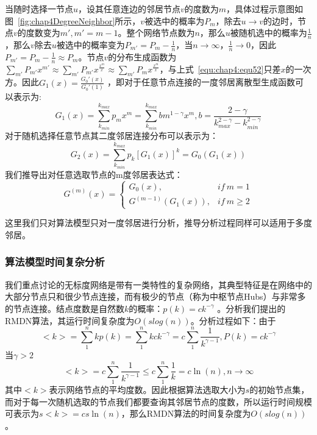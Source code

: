 当随时选择一节点$u$，设其任意连边的邻居节点$v$的度数为$m$，具体过程示意图如图~\ref{fig:chap4DegreeNeighbor}所示，$v$被选中的概率为$P_m$，除去$u\to v$的边时，节点$v$的度数变为$m',m'= m-1$。整个网络节点数为$n$，那么$u$被随机选中的概率为$\frac{1}{n}$，那么$v$除去$u$被选中的概率变为$P_{m'}=P_m-\frac{1}{n}$，当$n\to \infty $，$\frac{1}{n} \to 0$，因此$P_{m'}=P_m-\frac{1}{n} \approx P_m$。节点$v$的分布生成函数为$\sum_{m'}P_{m'}x^{m'} \approx \sum_{m'}P_{m'}x^{\frac{x^m}{x}} \approx \sum_{m'}P_{m}x^{\frac{x^m}{x}} $，与上式~\ref{equ:chap4:equ52}只差$x$的一次方。因此$G_1(x)=\frac{G_0'(x)}{G_0'(1)}$
，即对于任意节点连接的一度邻居离散型生成函数可以表示为:
\begin{equation}
\label{equ:chap4:equ8}
G_{1}(x) = \sum_{k_{min}}^{k_{max}}p_{m}x^{m} = \sum_{k_{min}}^{k_{max}}bm^{1-\gamma}x^{m}, b = \frac{2-\gamma}{k_{max}^{2-\gamma}-k_{min}^{2-\gamma}}
\end{equation}
对于随机选择任意节点其二度邻居连接分布可以表示为：
\begin{equation}
\label{equ:chap4:equ9}
G_{2}(x) = \sum_{k_{min}}^{k_{max}}p_{k}{[G_{1}(x)]}^{k} = G_{0}(G_{1}(x))
\end{equation}
我们推导出对任意选取节点的m度邻居表达式：
\begin{equation}
\label{equ:chap4:equ10}
G^{(m)}(x) = 
\begin{cases} 
G_{0}(x), & if ~ m = 1 \\
G^{(m-1)}(G_{1}(x)), & if ~ m \geq 2
\end{cases}
\end{equation}

这里我们只对算法模型只对一度邻居进行分析，推导分析过程同样可以适用于多度邻居。
\subsubsection{算法模型时间复杂分析}
我们重点讨论的无标度网络是带有一类特性的复杂网络，其典型特征是在网络中的大部分节点只和很少节点连接，而有极少的节点（称为中枢节点Hubs）与非常多的节点连接。结点度数是自然数$k$的概率：$p(k) = ck^{-\gamma}$ \cite{cohen2003efficient}。分析我们提出的RMDN算法，其运行时间复杂度为$O(slog(n))$。分析过程如下：由于
\begin{equation}
<k>=\sum_ {1}^{n}kp(k)=\sum_{1}^{n}kck^{-\gamma}=c\sum_{1}^{n}\frac{1}{k^{\gamma -1}},P(k)=ck^{-\gamma}
\end{equation}
当$\gamma >2$
\begin{equation}
<k>=c\sum_{1}^{n}\frac{1}{k^{\gamma -1}} \le c\sum\limits_{1}^{n}\frac{1}{k}=c\ln (n),n\to \infty
\end{equation}
其中$<k>$表示网络节点的平均度数。因此根据算法选取大小为$s$的初始节点集，而对于每一次随机选取的节点我们都要查询其邻居节点的度数，所以运行时间规模可表示为$s<k>=cs\ln (n)$，那么RMDN算法的时间复杂度为$O(slog(n))$。

